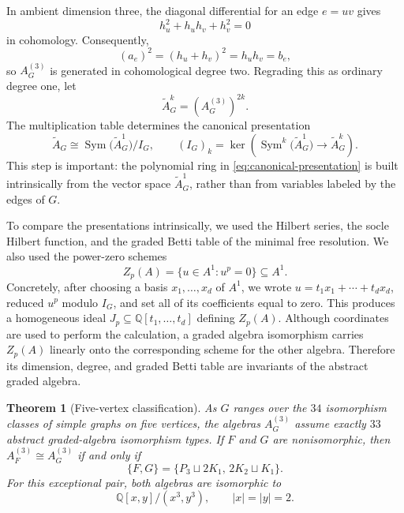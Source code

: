\documentclass[11pt]{amsart}
\theoremstyle{plain}
\newtheorem{theorem}{Theorem}[section]
\theoremstyle{definition}
\theoremstyle{remark}
\newcommand{\Q}{\mathbb{Q}}
\begin{document}
In ambient dimension three, the diagonal differential for an edge $e=uv$
gives
\[
  h_u^2+h_uh_v+h_v^2=0
\]
in cohomology.  Consequently,
\[
  (a_e)^2=(h_u+h_v)^2=h_uh_v=b_e,
\]
so $A_G^{(3)}$ is generated in cohomological degree two.  Regrading this as
ordinary degree one, let
\[
  \widetilde A_G^k=(A_G^{(3)})^{2k}.
\]
The multiplication table determines the canonical presentation
\begin{equation}\label{eq:canonical-presentation}
  \widetilde A_G
  \cong
  \operatorname{Sym}\bigl(\widetilde A_G^1\bigr)/I_G,
  \qquad
  (I_G)_k
  =\ker\!\left(
    \operatorname{Sym}^k\bigl(\widetilde A_G^1\bigr)
    \longrightarrow \widetilde A_G^k
  \right).
\end{equation}
This step is important: the polynomial ring in
\eqref{eq:canonical-presentation} is built intrinsically from the vector space
\(\widetilde A_G^1\), rather than from variables labeled by the edges of \(G\).

To compare the presentations intrinsically, we used the Hilbert series, the
socle Hilbert function, and the graded Betti table of the minimal free
resolution.  We also used the power-zero schemes
\[
  Z_p(A)=\{u\in A^1:u^p=0\}\subseteq A^1.
\]
Concretely, after choosing a basis $x_1,\ldots,x_d$ of $A^1$, we wrote
$u=t_1x_1+\cdots+t_dx_d$, reduced $u^p$ modulo $I_G$, and set all of its
coefficients equal to zero.  This produces a homogeneous ideal
$J_p\subseteq\Q[t_1,\ldots,t_d]$ defining $Z_p(A)$.  Although coordinates are
used to perform the calculation, a graded algebra isomorphism carries
$Z_p(A)$ linearly onto the corresponding scheme for the other algebra.
Therefore its dimension, degree, and graded Betti table are invariants of the
abstract graded algebra.

\begin{theorem}[Five-vertex classification]
\label{thm:five-vertex-classification}
As $G$ ranges over the $34$ isomorphism classes of simple graphs on five
vertices, the algebras $A_G^{(3)}$ assume exactly $33$ abstract graded-algebra
isomorphism types.  If $F$ and $G$ are nonisomorphic, then
\(A_F^{(3)}\cong A_G^{(3)}\) if and only if
\[
  \{F,G\}
  =\{P_3\sqcup 2K_1,\,2K_2\sqcup K_1\}.
\]
For this exceptional pair, both algebras are isomorphic to
\[
  \Q[x,y]/(x^3,y^3),
  \qquad |x|=|y|=2.
\]
\end{theorem}
\end{document}
